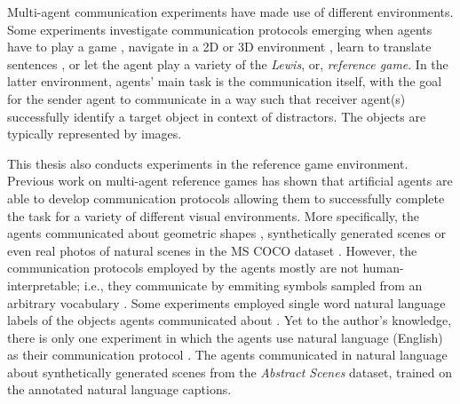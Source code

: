 Multi-agent communication experiments have made use of different environments. Some experiments investigate communication protocols emerging when agents have to play a game , navigate in a 2D or 3D environment \parencite{das2019tarmac, jaques2019social}, learn to translate sentences \parencite{lee2019countering}, or let the agent play a variety of the \textit{Lewis}, or, \textit{reference game}. In the latter environment, agents' main task is the communication itself, with the goal for the sender agent to communicate in a way such that receiver agent(s) successfully identify a target object in context of distractors. The objects are typically represented by images. 

This thesis also conducts experiments in the reference game environment. Previous work on multi-agent reference games has shown that artificial agents are able to develop communication protocols allowing them to successfully complete the task \parencite{lazaridou2016multi} for a variety of different visual environments. More specifically, the agents communicated about geometric shapes , synthetically generated scenes \parencite{lazaridou2020multi} or even real photos of natural scenes in the MS COCO dataset \parencite{lazaridou2016multi, lin2014microsoft}. However, the communication protocols employed by the agents mostly are not human-interpretable; i.e., they communicate by emmiting symbols sampled from an arbitrary vocabulary . Some experiments employed single word natural language labels of the objects agents communicated about \parencite{lazaridou2016multi}. Yet to the author's knowledge, there is only one experiment in which the agents use natural language (English) as their communication protocol \parencite{lazaridou2020multi} . The agents communicated in natural language about synthetically generated scenes from the \textit{Abstract Scenes} dataset, trained on the annotated natural language captions. 

